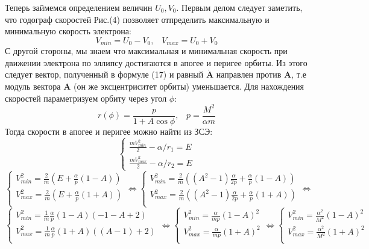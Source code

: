 \documentclass[12pt]{article}
\begin{document}
	Теперь займемся определением величин $U_0,V_0$. Первым делом следует заметить, что годограф скоростей Рис.(4) позволяет отпределить максимальную и минимальную скорость электрона:
	\begin{equation}V_{min} = U_0-V_0,\;\;\;V_{max} = U_0 + V_0\end{equation}
	С другой стороны, мы знаем что максимальная и минимальная скорость при движении электрона по эллипсу достигаются в апогее и перигее орбиты. Из этого следует вектор, полученный в формуле (17) и равный $\mathbf{\dot{A}}$ направлен против $\mathbf{A}$, т.е модуль вектора $\mathbf{A}$ (он же эксцентриситет орбиты) уменьшается.
	Для нахождения скоростей параметризуем орбиту через угол $\phi$:
	\[r(\phi) = \frac{p}{1+A\cos \phi },\;\;\; p = \frac{M^2}{\alpha m}\]
	Тогда скорости в апогее и перигее можно найти из ЗСЭ:
	\[\begin{cases}\frac{mV^2_{min}}{2} - \alpha/r_1 = E\\ \frac{mV^2_{max}}{2} - \alpha/r_2 = E\end{cases}\]
	\[\begin{cases}
	V^2_{min} = \frac{2}{m}(E+\frac{\alpha}{p}(1-A)) \\
	V^2_{max} = \frac{2}{m}(E+\frac{\alpha}{p}(1+A)) \\
	\end{cases} \Leftrightarrow 
	\begin{cases}
	V^2_{min} = \frac{2}{m}((A^2-1)\frac{\alpha}{2p}+\frac{\alpha}{p}(1-A)) \\
	V^2_{max} = \frac{2}{m}((A^2-1)\frac{\alpha}{2p}+\frac{\alpha}{p}(1+A)) \\
	\end{cases} \Leftrightarrow \]
	\[
		\begin{cases}
		V^2_{min} = \frac{1}{m}\frac{\alpha}{p}(1-A)(-1-A+2)  \\
		V^2_{max} = \frac{1}{m}\frac{\alpha}{p}(1+A)((A-1)+2) \\
		\end{cases}
		\Leftrightarrow
		\begin{cases}
		V^2_{min} = \frac{\alpha}{mp}(1-A)^2 \\
		V^2_{max} = \frac{\alpha}{mp}(1+A)^2 \\
		\end{cases}
		\Leftrightarrow
		\begin{cases}
		V^2_{min} = \frac{\alpha^2}{M^2}(1-A)^2 \\
		V^2_{max} = \frac{\alpha^2}{M^2}(1+A)^2 \\
		\end{cases}
	\]
\end{document}
